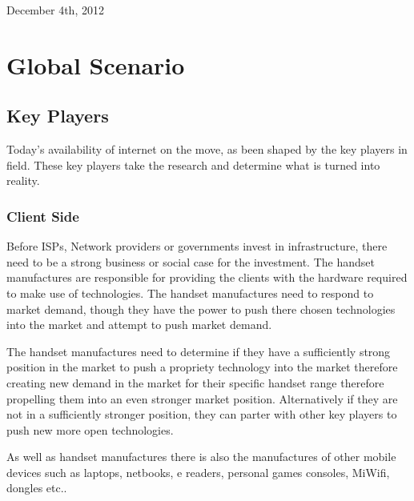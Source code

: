 \documentclass[journal]{IEEEtran}
\begin{document}
 
\hfill December 4th, 2012

\section{Global Scenario} %

\subsection{Key Players}

Today's availability of internet on the move, as been shaped by the key players in field. These key players take the research and determine what is turned into reality.

\subsubsection{Client Side}

Before ISPs, Network providers or governments invest in infrastructure, there need to be a strong business or social case for the investment. The handset manufactures are responsible for providing the clients with the hardware required to make use of technologies. The handset manufactures need to respond to market demand, though they have the power to push there chosen technologies into the market and attempt to push market demand. 

The handset manufactures need to determine if they have a sufficiently strong position in the market to push a propriety technology into the market therefore creating new demand in the market for their specific handset range therefore propelling them into an even stronger market position. Alternatively if they are not in a sufficiently stronger position, they can parter with other key players to push new more open technologies. 

As well as handset manufactures there is also the manufactures of other mobile devices such as laptops, netbooks, e readers, personal games consoles, MiWifi, dongles etc..
\end{document}
